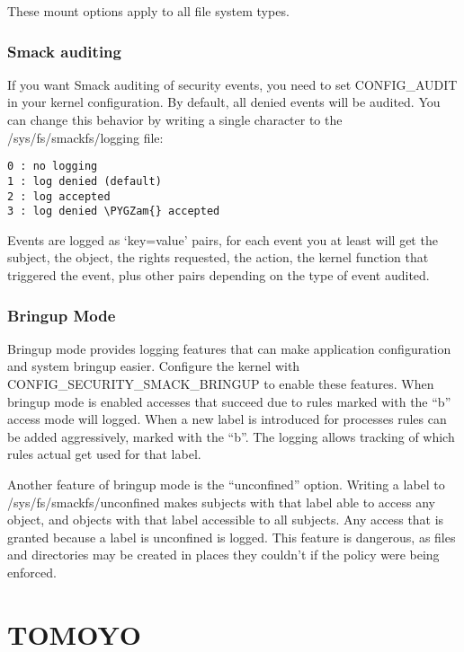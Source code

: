 \documentclass[a4paper,8pt,english]{sphinxmanual}
\def\PYGZam{\char`\&}
\begin{document}
These mount options apply to all file system types.


\subsubsection{Smack auditing}
\label{admin-guide/LSM/Smack:smack-auditing}
If you want Smack auditing of security events, you need to set CONFIG\_AUDIT
in your kernel configuration.
By default, all denied events will be audited. You can change this behavior by
writing a single character to the /sys/fs/smackfs/logging file:

\begin{Verbatim}[commandchars=\\\{\}]
0 : no logging
1 : log denied (default)
2 : log accepted
3 : log denied \PYGZam{} accepted
\end{Verbatim}

Events are logged as `key=value' pairs, for each event you at least will get
the subject, the object, the rights requested, the action, the kernel function
that triggered the event, plus other pairs depending on the type of event
audited.


\subsubsection{Bringup Mode}
\label{admin-guide/LSM/Smack:bringup-mode}
Bringup mode provides logging features that can make application
configuration and system bringup easier. Configure the kernel with
CONFIG\_SECURITY\_SMACK\_BRINGUP to enable these features. When bringup
mode is enabled accesses that succeed due to rules marked with the ``b''
access mode will logged. When a new label is introduced for processes
rules can be added aggressively, marked with the ``b''. The logging allows
tracking of which rules actual get used for that label.

Another feature of bringup mode is the ``unconfined'' option. Writing
a label to /sys/fs/smackfs/unconfined makes subjects with that label
able to access any object, and objects with that label accessible to
all subjects. Any access that is granted because a label is unconfined
is logged. This feature is dangerous, as files and directories may
be created in places they couldn't if the policy were being enforced.


\section{TOMOYO}
\label{admin-guide/LSM/tomoyo:tomoyo}\label{admin-guide/LSM/tomoyo::doc}
\end{document}

